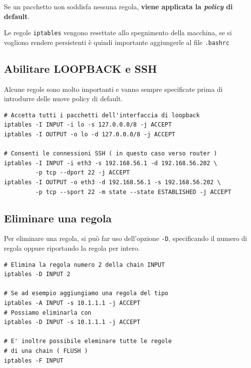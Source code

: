 \documentclass[a4paper]{report}
\newenvironment{ricordati}{\begin{tcolorbox}[fonttitle=\sffamily\bfseries\large,title=Ricordati,colframe=orange!75!white]}{\end{tcolorbox}}
\newenvironment{code}{\begin{tcolorbox}[size=small]}{\end{tcolorbox}}
\begin{document}
\begin{ricordati}
	Se un pacchetto non soddisfa nessuna regola, \textbf{viene applicata la \textit{policy} di default}.
\end{ricordati}

\begin{ricordati}
	Le regole \texttt{iptables} vengono resettate allo spegnimento della macchina, se si vogliono rendere persistenti è quindi importante aggiungerle al file \texttt{.bashrc}
\end{ricordati}

\subsection{Abilitare LOOPBACK e SSH}

Alcune regole sono molto importanti e vanno sempre specificate prima di introdurre delle nuove policy di default.

\begin{code}
\begin{lstlisting}
# Accetta tutti i pacchetti dell'interfaccia di loopback
iptables -I INPUT -i lo -s 127.0.0.0/8 -j ACCEPT
iptables -I OUTPUT -o lo -d 127.0.0.0/8 -j ACCEPT

# Consenti le connessioni SSH ( in questo caso verso router )
iptables -I INPUT -i eth3 -s 192.168.56.1 -d 192.168.56.202 \
         -p tcp --dport 22 -j ACCEPT
iptables -I OUTPUT -o eth3 -d 192.168.56.1 -s 192.168.56.202 \
         -p tcp --sport 22 -m state --state ESTABLISHED -j ACCEPT
\end{lstlisting}
\end{code}

\subsection{Eliminare una regola}

Per eliminare una regola, si può far uso dell'opzione \texttt{-D}, specificando il numero di regola oppure riportando la regola per intero.

\begin{code}
\begin{lstlisting}
# Elimina la regola numero 2 della chain INPUT
iptables -D INPUT 2

# Se ad esempio aggiungiamo una regola del tipo
iptables -A INPUT -s 10.1.1.1 -j ACCEPT
# Possiamo eliminarla con
iptables -D INPUT -s 10.1.1.1 -j ACCEPT

# E' inoltre possibile eleminare tutte le regole
# di una chain ( FLUSH )
iptables -F INPUT
\end{lstlisting}
\end{code}
\end{document}
